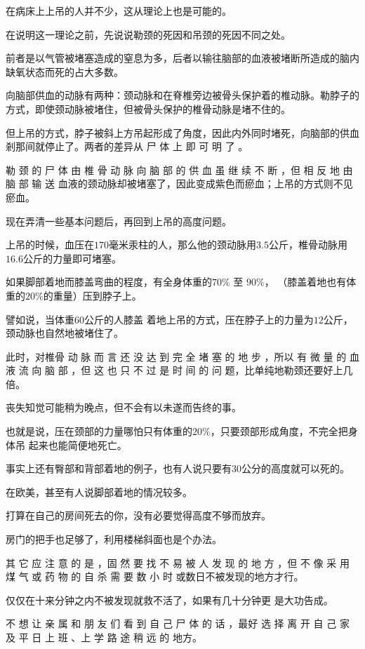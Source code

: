\documentclass[UTF8]{ctexart}
\begin{document}
在病床上上吊的人并不少，这从理论上也是可能的。

在说明这一理论之前，先说说勒颈的死因和吊颈的死因不同之处。

前者是以气管被堵塞造成的窒息为多，后者以输往脑部的血液被堵断所造成的脑内缺氧状态而死的占大多数。

向脑部供血的动脉有两种：颈动脉和在脊椎旁边被骨头保护着的椎动脉。勒脖子的方式，即使颈动脉被堵住，但被骨头保护的椎骨动脉是堵不住的。

但上吊的方式，脖子被斜上方吊起形成了角度，因此内外同时堵死，向脑部的供血剎那间就停止了。两者的差异从 尸 体 上 即 可 明 了 。

勒 颈 的 尸 体 由 椎 骨 动 脉 向 脑 部 的 供 血 虽 继 续 不 断 ，但 相 反 地 由 脑 部 输 送 血液的颈动脉却被堵塞了，因此变成紫色而瘀血；上吊的方式则不见瘀血。

现在弄清一些基本问题后，再回到上吊的高度问题。

上吊的时候，血压在$170$毫米汞柱的人，那么他的颈动脉用$3.5$公斤，椎骨动脉用$16.6$公斤的力量即可堵塞。

如果脚部着地而膝盖弯曲的程度，有全身体重的$70\%$ 至 $90\%$， （膝盖着地也有体重的$20\%$的重量）压到脖子上。

譬如说，当体重$60$公斤的人膝盖 着地上吊的方式，压在脖子上的力量为$12$公斤，颈动脉也自然地被堵住了。

此时，对椎骨 动 脉 而 言 还 没 达 到 完 全 堵 塞 的 地 步 ，所以 有 微 量 的 血 液 流 向 脑 部 ，但 这 也 只 不 过 是 时 间 的 问 题，比单纯地勒颈还要好上几倍。

丧失知觉可能稍为晚点，但不会有以未遂而告终的事。

也就是说，压在颈部的力量哪怕只有体重的$20\%$，只要颈部形成角度，不完全把身体吊 起来也能简便地死亡。

事实上还有臀部和背部着地的例子，也有人说只要有$30$公分的高度就可以死的。

在欧美，甚至有人说脚部着地的情况较多。

打算在自己的房间死去的你，没有必要觉得高度不够而放弃。

房门的把手也足够了，利用楼梯斜面也是个办法。

其 它 应 注 意 的 是 ，固 然 要 找 不 易 被 人 发 现 的 地 方 ，但 不 像 采 用 煤 气 或 药 物 的 自 杀 需 要 数 小 时 或数日不被发现的地方才行。

仅仅在十来分钟之内不被发现就救不活了，如果有几十分钟更 是大功告成。

不 想 让 亲 属 和 朋 友 们 看 到 自 己 尸 体 的 话 ，最好 选 择 离 开 自 己 家 及 平 日 上 班 、上 学 路 途 稍 远 的 地方。
\end{document}
